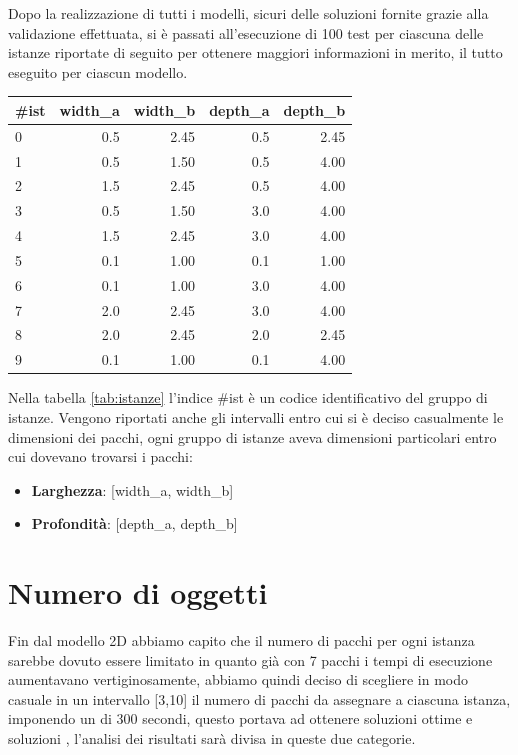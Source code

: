 Dopo la realizzazione di tutti i modelli, sicuri delle soluzioni fornite grazie alla validazione effettuata, si è passati all'esecuzione di 100 test per ciascuna delle istanze riportate di seguito per ottenere maggiori informazioni in merito, il tutto eseguito per ciascun modello.
\begin{center}
	\begin{tabular}{lrrrr}
		\toprule
		{}
		\#ist & width\_a & width\_b & depth\_a & depth\_b \\
		\midrule
		0     & 0.5      & 2.45     & 0.5      & 2.45     \\
		1     & 0.5      & 1.50     & 0.5      & 4.00     \\
		2     & 1.5      & 2.45     & 0.5      & 4.00     \\
		3     & 0.5      & 1.50     & 3.0      & 4.00     \\
		4     & 1.5      & 2.45     & 3.0      & 4.00     \\
		5     & 0.1      & 1.00     & 0.1      & 1.00     \\
		6     & 0.1      & 1.00     & 3.0      & 4.00     \\
		7     & 2.0      & 2.45     & 3.0      & 4.00     \\
		8     & 2.0      & 2.45     & 2.0      & 2.45     \\
		9     & 0.1      & 1.00     & 0.1      & 4.00     \\
		\bottomrule
	\end{tabular}
	\label{tab:istanze}
\end{center}

Nella tabella \ref{tab:istanze} l'indice \#ist è un codice identificativo del gruppo di istanze. Vengono riportati anche gli intervalli entro cui si è deciso casualmente le dimensioni dei pacchi, ogni gruppo di istanze aveva dimensioni particolari entro cui dovevano trovarsi i pacchi:
\begin{itemize}
	\item \textbf{Larghezza}: [width\_a, width\_b]
	\item \textbf{Profondità}: [depth\_a, depth\_b]
\end{itemize}

\section{Numero di oggetti}
Fin dal modello 2D abbiamo capito che il numero di pacchi per ogni istanza sarebbe dovuto essere limitato in quanto già con 7 pacchi i tempi di esecuzione aumentavano vertiginosamente, abbiamo quindi deciso di scegliere in modo casuale in un intervallo [3,10] il numero di pacchi da assegnare a ciascuna istanza, imponendo un  di 300 secondi, questo portava ad ottenere soluzioni ottime e soluzioni , l'analisi dei risultati sarà divisa in queste due categorie.

